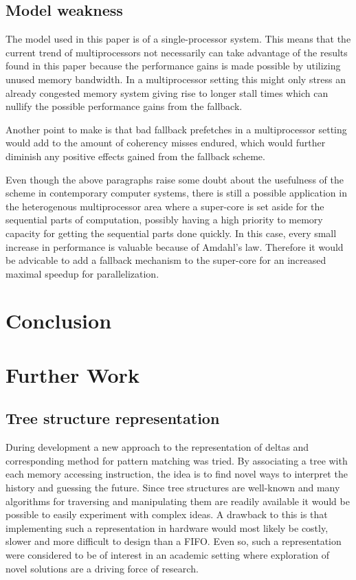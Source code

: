 \documentclass[12pt,journal,compsoc]{IEEEtran}
\begin{document}
\subsection{Model weakness}
The model used in this paper is of a single-processor system.
This means that the current trend of multiprocessors not
necessarily can take advantage of the results found in
this paper because the performance gains is made possible
by utilizing unused memory bandwidth. In a multiprocessor
setting this might only stress an already congested memory
system giving rise to longer stall times which can nullify
the possible performance gains from the fallback.

Another point to make is that bad fallback prefetches in a
multiprocessor setting would add to the amount of coherency
misses endured, which would further diminish any positive
effects gained from the fallback scheme.

Even though the above paragraphs raise some doubt about
the usefulness of the scheme in contemporary computer systems,
there is still a possible application in the heterogenous
multiprocessor area where a super-core is set aside for the
sequential parts of computation, possibly having a high priority
to memory capacity for getting the sequential parts done quickly.
In this case, every small increase in performance is valuable
because of Amdahl's law. Therefore it would be advicable to add
a fallback mechanism to the super-core for an increased maximal
speedup for parallelization.

\section{Conclusion}

\section{Further Work}

\subsection{Tree structure representation}
During development a new approach to the representation of deltas
and corresponding method for pattern matching was tried. By associating
a tree with each memory accessing instruction, the idea is to find novel ways
to interpret the history and guessing the future. Since tree structures
are well-known and many algorithms for traversing and manipulating them
are readily available it would be possible to easily experiment
with complex ideas. A drawback to this is that implementing such a
representation in hardware would most likely be costly, slower
and more difficult to design than a FIFO. Even so, such a
representation were considered to be of interest in an academic
setting where exploration of novel solutions are a driving force of
research.
\end{document}
